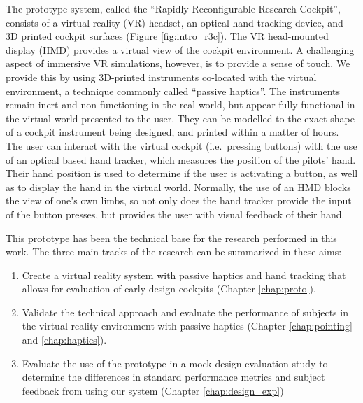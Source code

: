 The prototype system, called the ``Rapidly Reconfigurable Research Cockpit'', consists of a virtual reality (VR) headset, an optical hand tracking device, and 3D printed cockpit surfaces (Figure \ref{fig:intro_r3c}).
The VR head-mounted display (HMD) provides a virtual view of the cockpit environment.
A challenging aspect of immersive VR simulations, however, is to provide a sense of touch.
We provide this by using 3D-printed instruments co-located with the virtual environment, a technique commonly called ``passive haptics''.
The instruments remain inert and non-functioning in the real world, but appear fully functional in the virtual world presented to the user.
They can be modelled to the exact shape of a cockpit instrument being designed, and printed within a matter of hours.
The user can interact with the virtual cockpit (i.e.\ pressing buttons) with the use of an optical based hand tracker, which measures the position of the pilots' hand.
Their hand position is used to determine if the user is activating a button, as well as to display the hand in the virtual world.
Normally, the use of an HMD blocks the view of one's own limbs, so not only does the hand tracker provide the input of the button presses, but provides the user with visual feedback of their hand.

This prototype has been the technical base for the research performed in this work.
The three main tracks of the research can be summarized in these aims:


\begin{enumerate}
    \item Create a virtual reality system with passive haptics and hand tracking that allows for evaluation of early design cockpits (Chapter \ref{chap:proto}).
    \item Validate the technical approach and evaluate the performance of subjects in the virtual reality environment with passive haptics (Chapter \ref{chap:pointing} and \ref{chap:haptics}).
    \item Evaluate the use of the prototype in a mock design evaluation study to determine the differences in standard performance metrics and subject feedback from using our system (Chapter \ref{chap:design_exp})
\end{enumerate}


